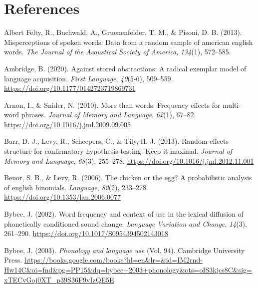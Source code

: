 \documentclass[
  12pt,
]{scrartcl}
\newlength{\cslhangindent}
\newenvironment{CSLReferences}[2] %
 {\begin{list}{}{%
  \setlength{\itemindent}{0pt}
  \setlength{\leftmargin}{0pt}
  \setlength{\parsep}{0pt}
  \ifodd #1
   \setlength{\leftmargin}{\cslhangindent}
   \setlength{\itemindent}{-1\cslhangindent}
  \fi
  \setlength{\itemsep}{#2\baselineskip}}}
 {\end{list}}
\begin{document}
\clearpage

\section*{References}\label{references}

\label{refs}
\begin{CSLReferences}{1}{0}
Albert Felty, R., Buchwald, A., Gruenenfelder, T. M., \& Pisoni, D. B.
(2013). Misperceptions of spoken words: Data from a random sample of
american english words. \emph{The Journal of the Acoustical Society of
America}, \emph{134}(1), 572--585.

Ambridge, B. (2020). Against stored abstractions: A radical exemplar
model of language acquisition. \emph{First Language}, \emph{40}(5-6),
509--559. \url{https://doi.org/10.1177/0142723719869731}

Arnon, I., \& Snider, N. (2010). More than words: Frequency effects for
multi-word phrases. \emph{Journal of Memory and Language}, \emph{62}(1),
67--82. \url{https://doi.org/10.1016/j.jml.2009.09.005}

Barr, D. J., Levy, R., Scheepers, C., \& Tily, H. J. (2013). Random
effects structure for confirmatory hypothesis testing: Keep it maximal.
\emph{Journal of Memory and Language}, \emph{68}(3), 255--278.
\url{https://doi.org/10.1016/j.jml.2012.11.001}

Benor, S. B., \& Levy, R. (2006). The chicken or the egg? A
probabilistic analysis of english binomials. \emph{Language},
\emph{82}(2), 233--278. \url{https://doi.org/10.1353/lan.2006.0077}

Bybee, J. (2002). Word frequency and context of use in the lexical
diffusion of phonetically conditioned sound change. \emph{Language
Variation and Change}, \emph{14}(3), 261--290.
\url{https://doi.org/10.1017/S0954394502143018}

Bybee, J. (2003). \emph{Phonology and language use} (Vol. 94). Cambridge
University Press.
\url{https://books.google.com/books?hl=en&lr=&id=IM2rnd-Hw14C&oi=fnd&pg=PP15&dq=bybee+2003+phonology&ots=oIS3kjcs8C&sig=xTECvGoj0XT_p39S36F9vIzQE5E}


\end{CSLReferences}
\end{document}
